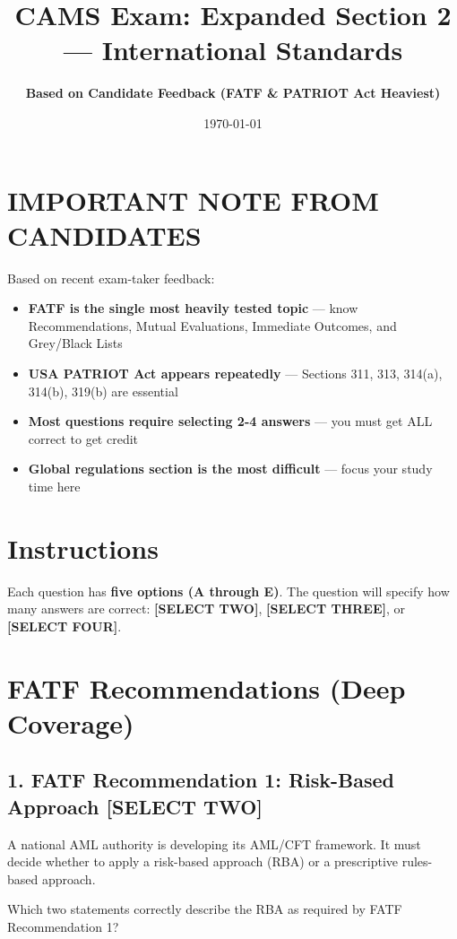 \documentclass[11pt,a4paper]{article}
\title{\textbf{CAMS Exam: Expanded Section 2 — International Standards}}
\author{\textbf{Based on Candidate Feedback (FATF \& PATRIOT Act Heaviest)}}
\date{\today}
\begin{document}
	
	\maketitle
	
	\section*{IMPORTANT NOTE FROM CANDIDATES}
	Based on recent exam-taker feedback:
	\begin{itemize}
		\item \textbf{FATF is the single most heavily tested topic} — know Recommendations, Mutual Evaluations, Immediate Outcomes, and Grey/Black Lists
		\item \textbf{USA PATRIOT Act appears repeatedly} — Sections 311, 313, 314(a), 314(b), 319(b) are essential
		\item \textbf{Most questions require selecting 2-4 answers} — you must get ALL correct to get credit
		\item \textbf{Global regulations section is the most difficult} — focus your study time here
	\end{itemize}
	
	\section*{Instructions}
	Each question has \textbf{five options (A through E)}. 
	The question will specify how many answers are correct: \textbf{[SELECT TWO]}, \textbf{[SELECT THREE]}, or \textbf{[SELECT FOUR]}.
	
	\newpage
	
	\section{FATF Recommendations (Deep Coverage)}
	
	\subsection{1. FATF Recommendation 1: Risk-Based Approach \textnormal{[SELECT TWO]}}
	
	A national AML authority is developing its AML/CFT framework. It must decide whether to apply a risk-based approach (RBA) or a prescriptive rules-based approach.
	
	Which two statements correctly describe the RBA as required by FATF Recommendation 1?
	
\end{document}
